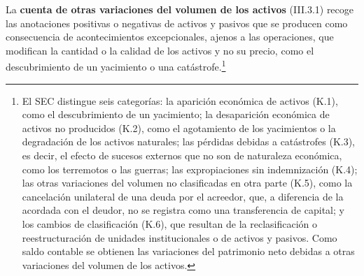 \documentclass[10pt,a4paper]{article}
\begin{document}
La \textbf{cuenta de otras variaciones del volumen de los activos} (III.3.1) recoge las anotaciones positivas o negativas de activos y pasivos que se producen como consecuencia de acontecimientos excepcionales, ajenos a las operaciones, que modifican la cantidad o la calidad de los activos y no su precio, como el descubrimiento de un yacimiento o una catástrofe.\footnote{%
  El SEC distingue seis categorías: la aparición económica de activos (K.1), como el descubrimiento de un yacimiento; la desaparición económica de activos no producidos (K.2), como el agotamiento de los yacimientos o la degradación de los activos naturales; las pérdidas debidas a catástrofes (K.3), es decir, el efecto de sucesos externos que no son de naturaleza económica, como los terremotos o las guerras; las expropiaciones sin indemnización (K.4); las otras variaciones del volumen no clasificadas en otra parte (K.5), como la cancelación unilateral de una deuda por el acreedor, que, a diferencia de la acordada con el deudor, no se registra como una transferencia de capital; y los cambios de clasificación (K.6), que resultan de la reclasificación o reestructuración de unidades institucionales o de activos y pasivos. Como saldo contable se obtienen las variaciones del patrimonio neto debidas a otras variaciones del volumen de los activos.
}
\end{document}
